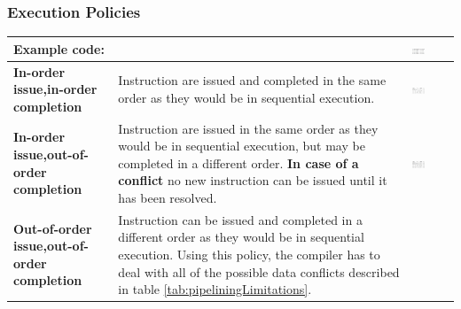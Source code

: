 		\subsubsection{Execution Policies}
			\begin{longtable}{|>{\bfseries}p{}|p{}|p{}|}
				\hline
				Example code:
					&
					& \vspace{0pt}
					
						\includegraphics[width=0.35\textwidth]{./pictures/exampleCodeExecutionPolicies.png}\\
				\hline
				In-order issue,\newline in-order completion
					& Instruction are issued and completed in the same order as they would be in sequential execution. 
					& \vspace{0pt}
					
						\includegraphics[width=0.35\textwidth]{./pictures/policyInOrderInOrder.png}\\
				\hline
				In-order issue,\newline out-of-order completion
					& Instruction are issued in the same order as they would be in sequential execution, but may be completed in a different order.\newline
						\textbf{In case of a conflict} no new instruction can be issued until it has been resolved.
					& \vspace{0pt}
					
						\includegraphics[width=0.35\textwidth]{./pictures/policyInOrderOutOfOrder.png}\\
				\hline
				Out-of-order issue,\newline out-of-order completion
					& Instruction can be issued and completed in a different order as they would be in sequential execution.\newline
						Using this policy, the compiler has to deal with all of the possible data conflicts described in table \ref{tab:pipeliningLimitations}.
					& \vspace{0pt}
					

\end{longtable}
